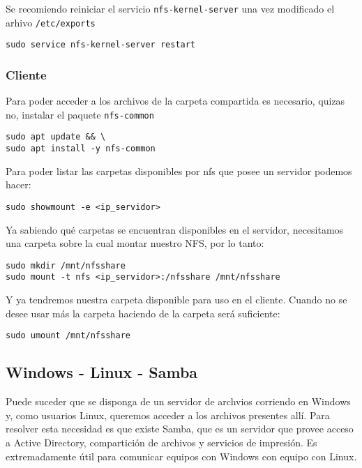 Se recomiendo reiniciar el servicio \texttt{nfs-kernel-server} una vez modificado el arhivo \texttt{/etc/exports} 

\begin{lstlisting}[bash]
sudo service nfs-kernel-server restart
\end{lstlisting}

\subsubsection{Cliente}

Para poder acceder a los archivos de la carpeta compartida es necesario, quizas no, instalar el paquete \texttt{nfs-common} 


\begin{lstlisting}[bash]
sudo apt update && \
sudo apt install -y nfs-common
\end{lstlisting}

Para poder listar las carpetas disponibles por nfs que posee un servidor podemos hacer:

\begin{lstlisting}[bash]
sudo showmount -e <ip_servidor>
\end{lstlisting}

Ya sabiendo qué carpetas se encuentran disponibles en el servidor, necesitamos una carpeta sobre la cual montar nuestro NFS, por lo tanto:

\begin{lstlisting}[bash]
sudo mkdir /mnt/nfsshare
sudo mount -t nfs <ip_servidor>:/nfsshare /mnt/nfsshare
\end{lstlisting}

Y ya tendremos nuestra carpeta disponible para uso en el cliente. Cuando no se desee usar más la carpeta haciendo  de la carpeta será suficiente:

\begin{lstlisting}[bash]
sudo umount /mnt/nfsshare
\end{lstlisting}

\subsection{Windows - Linux - Samba}

Puede suceder que se disponga de un servidor de archvios corriendo en Windows y, como usuarios Linux, queremos acceder a los archivos presentes allí. Para resolver esta necesidad es que existe Samba, que es un servidor que provee acceso a Active Directory, compartición de archivos y servicios de impresión. Es extremadamente útil para comunicar equipos con Windows con equipo con Linux.

